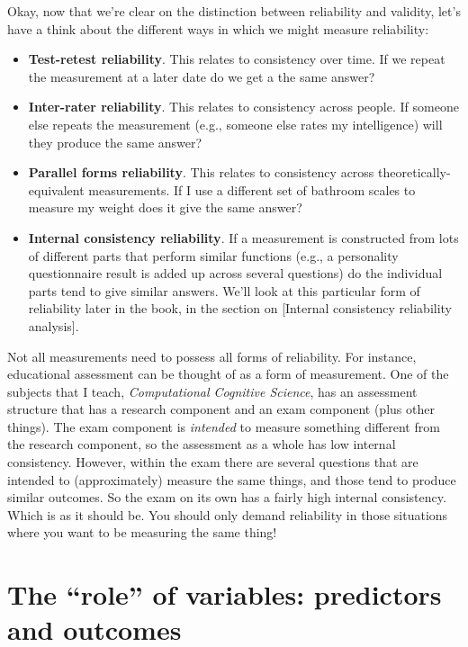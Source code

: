 \documentclass[
]{book}
\providecommand{\tightlist}{%
  \setlength{\itemsep}{0pt}\setlength{\parskip}{0pt}}
\begin{document}
Okay, now that we're clear on the distinction between reliability and validity, let's have a think about the different ways in which we might measure reliability:

\begin{itemize}
\tightlist
\item
  \textbf{Test-retest reliability}. This relates to consistency over time. If we repeat the measurement at a later date do we get a the same answer?
\item
  \textbf{Inter-rater reliability}. This relates to consistency across people. If someone else repeats the measurement (e.g., someone else rates my intelligence) will they produce the same answer?
\item
  \textbf{Parallel forms reliability}. This relates to consistency across theoretically-equivalent measurements. If I use a different set of bathroom scales to measure my weight does it give the same answer?
\item
  \textbf{Internal consistency reliability}. If a measurement is constructed from lots of different parts that perform similar functions (e.g., a personality questionnaire result is added up across several questions) do the individual parts tend to give similar answers. We'll look at this particular form of reliability later in the book, in the section on {[}Internal consistency reliability analysis{]}.
\end{itemize}

Not all measurements need to possess all forms of reliability. For instance, educational assessment can be thought of as a form of measurement. One of the subjects that I teach, \emph{Computational Cognitive Science}, has an assessment structure that has a research component and an exam component (plus other things). The exam component is \emph{intended} to measure something different from the research component, so the assessment as a whole has low internal consistency. However, within the exam there are several questions that are intended to (approximately) measure the same things, and those tend to produce similar outcomes. So the exam on its own has a fairly high internal consistency. Which is as it should be. You should only demand reliability in those situations where you want to be measuring the same thing!

\hypertarget{the-role-of-variables-predictors-and-outcomes}{%
\section{The ``role'' of variables: predictors and outcomes}\label{the-role-of-variables-predictors-and-outcomes}}
\end{document}
